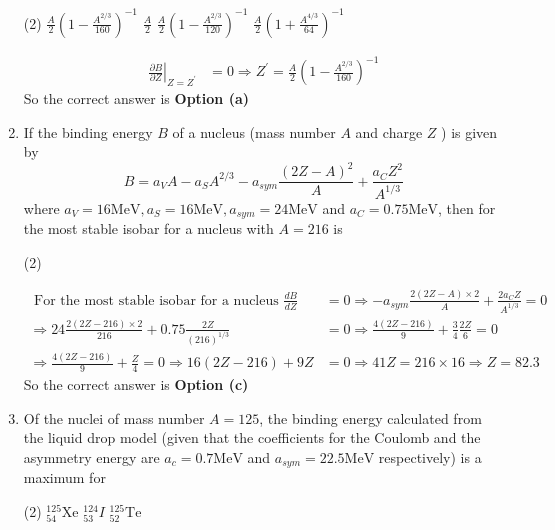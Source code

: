 \begin{enumerate}
	 \begin{tasks}(2)
		\task[\textbf{a.}]$\frac{A}{2}\left(1-\frac{A^{2 / 3}}{160}\right)^{-1}$
		\task[\textbf{b.}]$\frac{A}{2}$
		\task[\textbf{c.}] $\frac{A}{2}\left(1-\frac{A^{2 / 3}}{120}\right)^{-1}$
		\task[\textbf{d.}] $\frac{A}{2}\left(1+\frac{A^{4 / 3}}{64}\right)^{-1}$
	\end{tasks}
\begin{answer}
	\begin{align*}
	\left.\frac{\partial B}{\partial Z}\right|_{Z=Z^{\prime}}&=0 \Rightarrow Z^{\prime}=\frac{A}{2}\left(1-\frac{A^{2 / 3}}{160}\right)^{-1}
	\end{align*}
		So the correct answer is \textbf{Option (a)}
\end{answer}
	\item If the binding energy $B$ of a nucleus (mass number $A$ and charge $Z$ ) is given by
	$$
	B=a_V A-a_S A^{2 / 3}-a_{s y m} \frac{(2 Z-A)^2}{A}+\frac{a_C Z^2}{A^{1 / 3}}
	$$
	where $a_V=16 \mathrm{MeV}, a_S=16 \mathrm{MeV}, a_{s y m}=24 \mathrm{MeV}$ and $a_C=0.75 \mathrm{MeV}$, then for the most stable isobar for a nucleus with $A=216$ is
	 \begin{tasks}(2)
	\end{tasks}
\begin{answer}
	$$
	\begin{aligned}
	\text { For the most stable isobar for a nucleus } \frac{d B}{d Z}&=0 \Rightarrow-a_{s y m} \frac{2(2 Z-A) \times 2}{A}+\frac{2 a_C Z}{A^{1 / 3}}=0\\
	\Rightarrow 24 \frac{2(2 Z-216) \times 2}{216}+0.75 \frac{2 Z}{(216)^{1 / 3}}&=0 \Rightarrow \frac{4(2 Z-216)}{9}+\frac{3}{4} \frac{2 Z}{6}=0\\
	\Rightarrow \frac{4(2 Z-216)}{9}+\frac{Z}{4}=0 \Rightarrow 16(2 Z-216)+9 Z&=0 \Rightarrow 41 Z=216 \times 16 \Rightarrow Z=82.3
\end{aligned}
$$
	So the correct answer is \textbf{Option (c)}
\end{answer}
	\item Of the nuclei of mass number $A=125$, the binding energy calculated from the liquid drop model (given that the coefficients for the Coulomb and the asymmetry energy are $a_c=0.7 \mathrm{MeV}$ and $a_{s y m}=22.5 \mathrm{MeV}$ respectively) is a maximum for
	 \begin{tasks}(2)
		\task[\textbf{a.}]${ }_{54}^{125} \mathrm{Xe}$
		\task[\textbf{b.}]${ }_{53}^{124} I$
		\task[\textbf{c.}]${ }_{52}^{125} \mathrm{Te}$

\end{tasks}
\end{enumerate}
